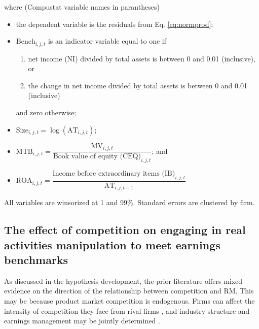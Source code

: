 \documentclass[notitlepage, 12pt]{article}
\begin{document}
\noindent where (Compustat variable names in parantheses)
\begin{itemize}
\item the dependent variable is the residuals from Eq. \eqref{eq:normprod};
\item $\text{Bench}_{i,j,t}$ is an indicator variable equal to one if
\begin{enumerate}
\item net income (NI) divided by total assets is between 0 and 0.01 (inclusive), or
\item the change in net income divided by total assets is between 0 and 0.01 (inclusive)
\end{enumerate}

and zero otherwise;

\item $\text{Size}_{i,j,t} = \log(\text{AT}_{i,j,t})$;
\item $\text{MTB}_{i,j,t} = \dfrac{\text{MV}_{i,j,t}}{\text{Book value of equity (CEQ)}_{i,j,t}}$; and
\item $\text{ROA}_{i,j,t} = \dfrac{\text{Income before extraordinary items (IB)}_{i,j,t}}{\text{AT}_{i,j,t-1}}$
\end{itemize}

\noindent All variables are winsorized at 1 and 99\%. Standard errors are clustered by firm.

\subsection{The effect of competition on engaging in real activities manipulation to meet earnings benchmarks}
As discussed in the hypothesis development, the prior literature offers mixed evidence on the direction of the relationship between competition and RM. This may be because product market competition is endogenous. Firms can affect the intensity of competition they face from rival firms \citep{valta:2012}, and industry structure and earnings management may be jointly determined \citep{bw:2010}.
\newline
\end{document}
